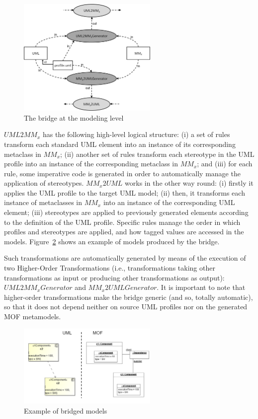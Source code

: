 \begin{figure}[htbp]
	\centering
	\includegraphics[width=0.60\textwidth]{figures/modelingLevel.png}
	\caption{The bridge at the modeling level}
	\label{fig:modelingLevel}
\end{figure}

$UML2MM_x$ has the following high-level logical structure: (i) a set of rules transform each standard UML element into an instance of its corresponding metaclass in $MM_x$; (ii) another set of rules transform each stereotype in the UML profile into an instance of the corresponding metaclass in $MM_x$; and (iii) for each rule, some imperative code is generated in order to automatically manage the application of stereotypes. $MM_x2UML$ works in the other way round: (i) firstly it applies the UML profile to the target UML model; (ii) then, it transforms each instance of metaclasses in $MM_x$ into an instance of the corresponding UML element; (iii) stereotypes are applied to  previously generated elements according to the definition of the UML profile. Specific rules manage the order in which profiles and stereotypes are applied, and how tagged values are accessed in the models. Figure~\ref{fig:modelingExample} shows an example of models produced by the bridge.

Such transformations are automatically generated by means of the execution of two Higher-Order Transformations
(i.e., transformations taking other transformations as input or producing
other transformations as output): $UML2MM_xGenerator$ and $MM_x2UMLGenerator$. It is important to note that higher-order transformations make the bridge generic (and so, totally automatic), so that it does not depend neither on source UML profiles nor on the generated MOF metamodels.

\begin{figure}[htbp]
	\centering
		\includegraphics[width=0.60\textwidth]{figures/modelingExample.png}
	\caption{Example of bridged models}
	\label{fig:modelingExample}
\end{figure}
%

